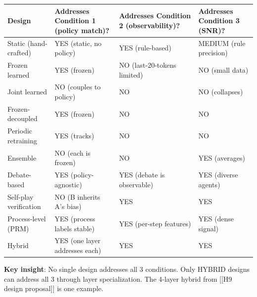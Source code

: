 \documentclass[11pt]{article}
\begin{document}
{\def\LTcaptype{none} %
\begin{longtable}[]{@{}
  >{\raggedright\arraybackslash}p{}
  >{\raggedright\arraybackslash}p{}
  >{\raggedright\arraybackslash}p{}
  >{\raggedright\arraybackslash}p{}@{}}
\toprule\noalign{}
\begin{minipage}[b]{\linewidth}\raggedright
Design
\end{minipage} & \begin{minipage}[b]{\linewidth}\raggedright
Addresses Condition 1 (policy match)?
\end{minipage} & \begin{minipage}[b]{\linewidth}\raggedright
Addresses Condition 2 (observability)?
\end{minipage} & \begin{minipage}[b]{\linewidth}\raggedright
Addresses Condition 3 (SNR)?
\end{minipage} \\
\midrule\noalign{}
\endhead
\bottomrule\noalign{}
\endlastfoot
Static (hand-crafted) & YES (static, no policy) & YES (rule-based) &
MEDIUM (rule precision) \\
Frozen learned & YES (frozen) & NO (last-20-tokens limited) & NO (small
data) \\
Joint learned & NO (couples to policy) & NO & NO (collapses) \\
Frozen-decoupled & YES (frozen) & NO & NO \\
Periodic retraining & YES (tracks) & NO & NO \\
Ensemble & NO (each is frozen) & NO & YES (averages) \\
Debate-based & YES (policy-agnostic) & YES (debate is observable) & YES
(diverse agents) \\
Self-play verification & NO (B inherits A's bias) & YES & YES \\
Process-level (PRM) & YES (process labels stable) & YES (per-step
features) & YES (dense signal) \\
Hybrid & YES (one layer addresses each) & YES & YES \\
\end{longtable}
}

\textbf{Key insight}: No single design addresses all 3 conditions. Only
HYBRID designs can address all 3 through layer specialization. The
4-layer hybrid from {[}{[}H9 design proposal{]}{]} is one example.
\end{document}
